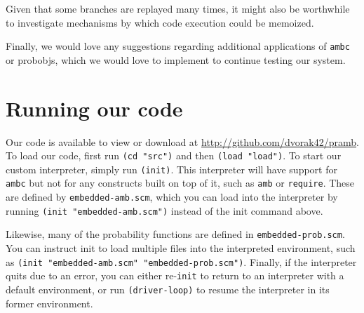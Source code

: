 \documentclass{article}
\begin{document}
Given that some branches are replayed many times, it might also be
worthwhile to investigate mechanisms by which code execution could be
memoized.

Finally, we would love any suggestions regarding additional
applications of \texttt{ambc} or probobjs, which we would love to
implement to continue testing our system.

\section{Running our code}

Our code is available to view or download at
\url{http://github.com/dvorak42/pramb}. To load our code, first run
\texttt{(cd "src")} and then \texttt{(load "load")}. To start our
custom interpreter, simply run \texttt{(init)}. This interpreter will
have support for \texttt{ambc} but not for any constructs built on top
of it, such as \texttt{amb} or \texttt{require}. These are defined by
\texttt{embedded-amb.scm}, which you can load into the interpreter by
running \texttt{(init "embedded-amb.scm")} instead of the init command
above.

Likewise, many of the probability functions are defined in
\texttt{embedded-prob.scm}. You can instruct init to load multiple
files into the interpreted environment, such as \texttt{(init
  "embedded-amb.scm" "embedded-prob.scm")}. Finally, if the
interpreter quits due to an error, you can either re-\texttt{init} to
return to an interpreter with a default environment, or run
\texttt{(driver-loop)} to resume the interpreter in its former
environment.
\end{document}
